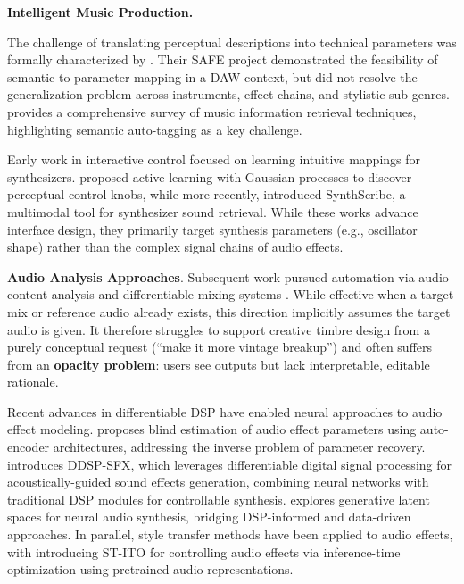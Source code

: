 \noindent\textbf{Intelligent Music Production.}

The challenge of translating perceptual descriptions into technical parameters was formally characterized by \citet{stables2014semantic}. Their SAFE project demonstrated the feasibility of semantic-to-parameter mapping in a DAW context, but did not resolve the generalization problem across instruments, effect chains, and stylistic sub-genres. \citet{schedl2014survey} provides a comprehensive survey of music information retrieval techniques, highlighting semantic auto-tagging as a key challenge.

Early work in interactive control focused on learning intuitive mappings for synthesizers. \citet{kuli2014active} proposed active learning with Gaussian processes to discover perceptual control knobs, while more recently, \citet{bryan2024synthscribe} introduced SynthScribe, a multimodal tool for synthesizer sound retrieval. While these works advance interface design, they primarily target synthesis parameters (e.g., oscillator shape) rather than the complex signal chains of audio effects.

\textbf{Audio Analysis Approaches}. Subsequent work pursued automation via audio content analysis and differentiable mixing systems \citep{steinmetz2022automix}. While effective when a target mix or reference audio already exists, this direction implicitly assumes the target audio is given. It therefore struggles to support creative timbre design from a purely conceptual request (``make it more vintage breakup'') and often suffers from an \textbf{opacity problem}: users see outputs but lack interpretable, editable rationale.

Recent advances in differentiable DSP have enabled neural approaches to audio effect modeling. \citet{peladeau2024blind} proposes blind estimation of audio effect parameters using auto-encoder architectures, addressing the inverse problem of parameter recovery. \citet{liu2024ddspSFX} introduces DDSP-SFX, which leverages differentiable digital signal processing for acoustically-guided sound effects generation, combining neural networks with traditional DSP modules for controllable synthesis. \citet{deemanat2025latent} explores generative latent spaces for neural audio synthesis, bridging DSP-informed and data-driven approaches. In parallel, style transfer methods have been applied to audio effects, with \citet{benetos2024stito} introducing ST-ITO for controlling audio effects via inference-time optimization using pretrained audio representations.

